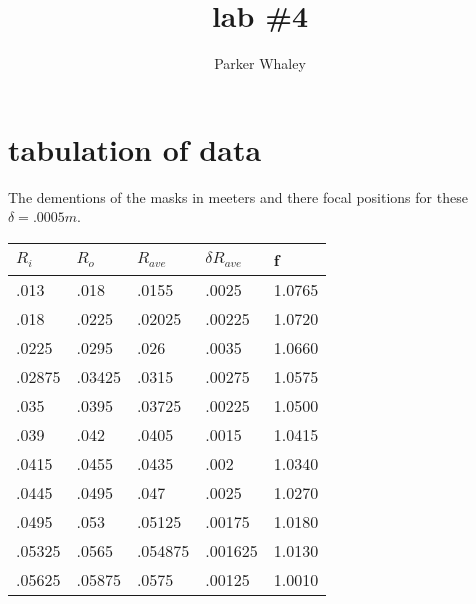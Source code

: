 \documentclass[12pt,a4paper]{article}
\author{Parker Whaley}
\title{lab \#4}
\begin{document}
\maketitle
\section{tabulation of data}
The dementions of the masks in meeters and there focal positions for these $\delta=.0005m$.\\
\begin{tabular}{|l|l|l|l|l|}
\hline
$R_i$ & $R_o$ & $R_{ave}$ & $\delta R_{ave}$ & f\\
\hline
.013 & .018 & .0155 & .0025&1.0765\\ \hline
.018 & .0225& .02025 & .00225&1.0720\\ \hline
.0225 & .0295& .026& .0035&1.0660\\ \hline
.02875 & .03425& .0315& .00275&1.0575\\ \hline
.035 & .0395& .03725& .00225&1.0500\\ \hline
.039 & .042 & .0405 & .0015&1.0415\\ \hline
.0415 & .0455& .0435& .002&1.0340\\ \hline
.0445 & .0495& .047& .0025&1.0270\\ \hline
.0495 & .053 & .05125& .00175&1.0180\\ \hline
.05325 & .0565 & .054875& .001625&1.0130\\ \hline
.05625 & .05875 & .0575& .00125&1.0010\\ \hline
\end{tabular}
\end{document}
